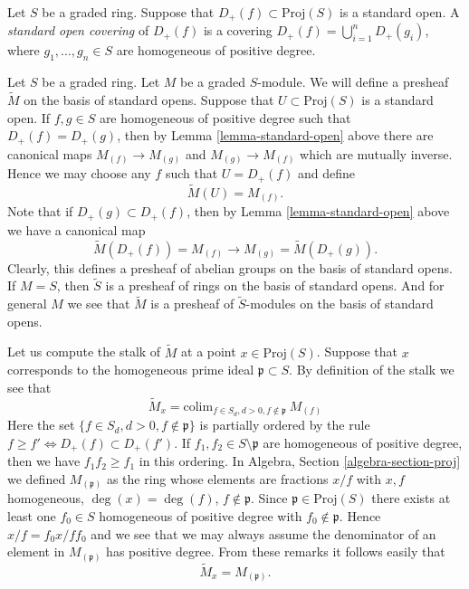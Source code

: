 \begin{definition}
\label{definition-standard-covering}
Let $S$ be a graded ring.
Suppose that $D_{+}(f) \subset \text{Proj}(S)$ is a standard
open. A {\it standard open covering} of $D_{+}(f)$
is a covering $D_{+}(f) = \bigcup_{i = 1}^n D_{+}(g_i)$,
where $g_1, \ldots, g_n \in S$ are homogeneous of positive degree.
\end{definition}

\noindent
Let $S$ be a graded ring. Let $M$ be a graded $S$-module. We will define
a presheaf $\widetilde M$ on the basis of standard opens.
Suppose that $U \subset \text{Proj}(S)$ is a standard open.
If $f, g \in S$ are homogeneous of positive degree
such that $D_{+}(f) = D_{+}(g)$, then
by Lemma \ref{lemma-standard-open} above there are canonical
maps $M_{(f)} \to M_{(g)}$ and $M_{(g)} \to M_{(f)}$ which are
mutually inverse. Hence we may choose any $f$ such that $U = D_{+}(f)$
and define
$$
\widetilde M(U) = M_{(f)}.
$$
Note that if $D_{+}(g) \subset D_{+}(f)$, then by
Lemma \ref{lemma-standard-open} above we have
a canonical map
$$
\widetilde M(D_{+}(f)) = M_{(f)} \longrightarrow
M_{(g)} = \widetilde M(D_{+}(g)).
$$
Clearly, this defines a presheaf of abelian groups on the basis
of standard opens. If $M = S$, then $\widetilde S$ is a presheaf
of rings on the basis of standard opens. And for general $M$ we
see that $\widetilde M$ is a presheaf of $\widetilde S$-modules
on the basis of standard opens.

\medskip\noindent
Let us compute the stalk of $\widetilde M$ at a point
$x \in \text{Proj}(S)$.
Suppose that $x$ corresponds to the homogeneous prime
ideal $\mathfrak p \subset S$.
By definition of the stalk we see that
$$
\widetilde M_x
=
\text{colim}_{f\in S_d, d > 0, f\not\in \mathfrak p}\ M_{(f)}
$$
Here the set $\{f\in S_d, d > 0, f\not\in \mathfrak p\}$ is partially
ordered by the rule $f \geq f' \Leftrightarrow D_{+}(f) \subset D_{+}(f')$.
If $f_1, f_2 \in S \setminus \mathfrak p$ are homogeneous of positive
degree, then we have
$f_1f_2 \geq f_1$ in this ordering. In
Algebra, Section \ref{algebra-section-proj}
we defined $M_{(\mathfrak p)}$ as the ring whose elements are fractions
$x/f$ with $x, f$ homogeneous, $\deg(x) = \deg(f)$, $f \not \in \mathfrak p$.
Since $\mathfrak p \in \text{Proj}(S)$ there exists at least
one $f_0 \in S$ homogeneous of positive degree with $f_0 \not\in \mathfrak p$.
Hence $x/f = f_0x/ff_0$ and we see that we may always assume
the denominator of an element in $M_{(\mathfrak p)}$ has positive degree.
From these remarks it follows easily that
$$
\widetilde M_x = M_{(\mathfrak p)}.
$$

